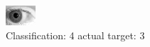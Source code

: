 \begin{figure}[h!]
\begin{center}
\includegraphics[width=0.60\columnwidth]{figures/ID232_class_4_target_3.png}
\end{center}
\caption{ Classification: 4 actual target: 3}
\label{fig:ID232_class_4_target_3}
\end{figure}
